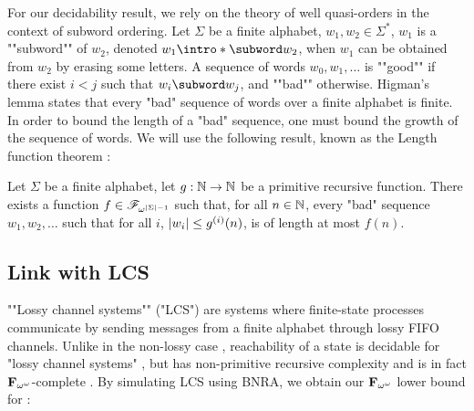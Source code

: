 For our decidability result, we rely on the theory of well quasi-orders in the context of subword ordering.
Let $\Sigma$ be a finite alphabet, $w_1, w_2 \in \Sigma^*$, $w_1$ is a ""subword"" of $w_2$, denoted $w_1 \intro*\subword w_2$, when $w_1$ can be obtained from $w_2$ by erasing some letters. 
A sequence of words $w_0, w_1, \ldots$ is ""good"" if there exist $i<j$ such that $w_i \subword w_j$, and ""bad"" otherwise. Higman's lemma \cite{Higman52} states that every "bad" sequence of words over a finite alphabet is finite.
In order to bound the length of a "bad" sequence, one must bound the growth of the sequence of words. 
We will use the following result, known as the Length function theorem \cite{SchmitzS2011upperHigman}:

\begin{theorem}
	\label{thm:lengthfcttheorem}
	Let $\Sigma$ be a finite alphabet, let $g : \mathbb{N} \to \mathbb{N}$ be a primitive recursive function.
	There exists a function $f \in \mathscr{F}_{\omega^{|\Sigma| - 1}}$ such that, for all $n \in \mathbb{N}$, every "bad" sequence $w_1, w_2, \ldots$ such that for all $i$, $|w_i| \leq g^{(i)}(n)$, is of length at most $f(n)$. 
\end{theorem}



\subsection{Link with LCS}

""Lossy channel systems"" ("LCS") are systems where finite-state processes communicate by sending messages from a finite alphabet through lossy FIFO channels. Unlike in the non-lossy case \cite{BZ83}, reachability of a state is decidable for "lossy channel systems" \cite{AbdullaJ1996verif}, but has non-primitive recursive complexity \cite{Schnoebelen2002verifying} and is in fact $\mathbf{F}_{\omega^{\omega}}$-complete \cite{ChambartS08ordinal}. 
By simulating LCS using BNRA, we obtain our $\mathbf{F}_{\omega^{\omega}}$ lower bound for \COVER:

